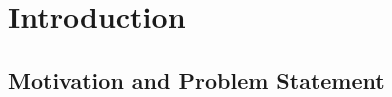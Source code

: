 \documentclass[numbered,pdftex]{ohio-etd}
\begin{document}


\chapter{Introduction}
\section{Motivation and Problem Statement}

\end{document}
